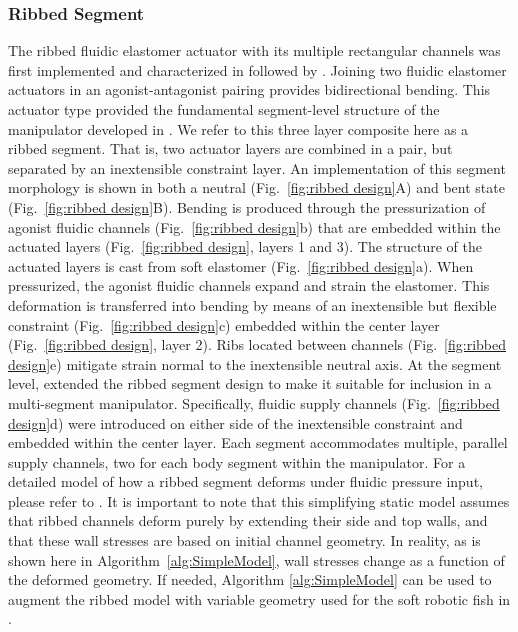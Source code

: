 \subsubsection{Ribbed Segment}
\label{subsubsec:Actuators, Actuator Morphologies, Ribbed}
The ribbed fluidic elastomer actuator with its multiple rectangular channels was first implemented and characterized in \citet{correll2010soft} followed by \citet{onal2011soft, onal2013autonomous}.
%
Joining two fluidic elastomer actuators in an agonist-antagonist pairing provides bidirectional bending.
%
This actuator type provided the fundamental segment-level structure of the manipulator developed in \citet{marchese2014design}.
%
We refer to this three layer composite here as a ribbed segment.
%
That is, two actuator layers are combined in a pair, but separated by an inextensible constraint layer.
%
An implementation of this segment morphology is shown in both a neutral (Fig.~\ref{fig:ribbed design}A) and bent state (Fig.~\ref{fig:ribbed design}B).
%
Bending is produced through the pressurization of agonist fluidic channels (Fig.~\ref{fig:ribbed design}b) that are embedded within the actuated layers (Fig.~\ref{fig:ribbed design}, layers 1 and 3).
%
The structure of the actuated layers is cast from soft elastomer (Fig.~\ref{fig:ribbed design}a).
%
When pressurized, the agonist fluidic channels expand and strain the elastomer.
%
This deformation is transferred into bending by means of an inextensible but flexible constraint (Fig.~\ref{fig:ribbed design}c) embedded within the center layer (Fig.~\ref{fig:ribbed design}, layer 2).
%
Ribs located between channels (Fig.~\ref{fig:ribbed design}e) mitigate strain normal to the inextensible neutral axis.
%
At the segment level, \citet{marchese2014design} extended the ribbed segment design to make it suitable for inclusion in a multi-segment manipulator.
%
Specifically, fluidic supply channels (Fig.~\ref{fig:ribbed design}d) were introduced on either side of the inextensible constraint and embedded within the center layer.
%
Each segment accommodates multiple, parallel supply channels, two for each body segment within the manipulator.
%
For a detailed model of how a ribbed segment deforms under fluidic pressure input, please refer to \citet{marchese2014autonomous}. %
%
It is important to note that this simplifying static model assumes that ribbed channels deform purely by extending their side and top walls, and that these wall stresses are based on initial channel geometry.
%
In reality, as is shown here in Algorithm~\ref{alg:SimpleModel}, wall stresses change as a function of the deformed geometry.
If needed, Algorithm \ref{alg:SimpleModel} can be used to augment the ribbed model with variable geometry used for the soft robotic fish in \citet{marchese2014autonomous}.

